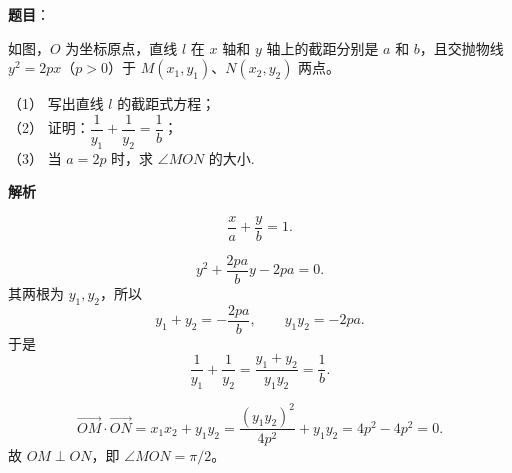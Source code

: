 \begin{answer}

\textbf{题目}：

如图，$O$ 为坐标原点，直线 $l$ 在 $x$ 轴和 $y$ 轴上的截距分别是 $a$ 和 $b$，且交抛物线 $y^2=2px$（$p>0$）于 $M(x_1,y_1)\text{、}N(x_2,y_2)$ 两点。

（1） 写出直线 $l$ 的截距式方程；\\
（2） 证明：$\dfrac1{y_1}+\dfrac1{y_2}=\dfrac1b$；\\
（3） 当 $a=2p$ 时，求 $\angle MON$ 的大小.
\nopagebreak[4]
\begin{center}\end{center}
\nopagebreak[4]
\textbf{解析}

\nopagebreak[4]
\[\frac xa+\frac yb=1.\]

\nopagebreak[4]
\[y^2+\frac{2pa}{b}y-2pa=0.\]
其两根为 $y_1,y_2$，所以
\nopagebreak[4]
\[y_1+y_2=-\frac{2pa}{b},\qquad y_1y_2=-2pa.\]
于是
\nopagebreak[4]
\[\frac1{y_1}+\frac1{y_2}=\frac{y_1+y_2}{y_1y_2}=\frac1b.\]

\nopagebreak[4]
\[\overrightarrow{OM}\cdot\overrightarrow{ON}
=x_1x_2+y_1y_2
=\frac{(y_1y_2)^2}{4p^2}+y_1y_2
=4p^2-4p^2=0.\]
故 $OM\perp ON$，即 $\angle MON=\pi/2$。




\end{answer}
